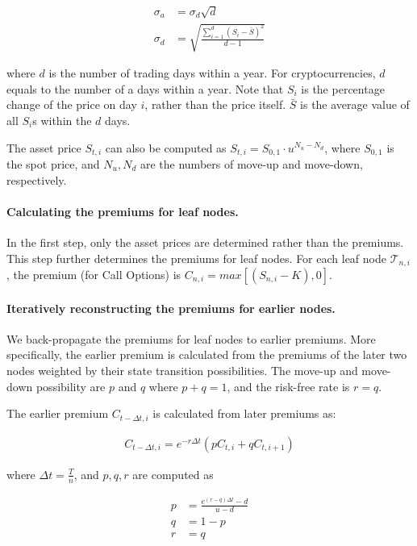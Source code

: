 \begin{align} 
\sigma_a &= \sigma_d \sqrt{d}\\
\sigma_d &= \sqrt{\frac{\sum^{d}_{i=1} (S_i - \bar{S})^2}{d-1}}
\end{align}

where $d$ is the number of trading days within a year.
For cryptocurrencies, $d$ equals to the number of a days within a year.
Note that $S_i$ is the percentage change of the price on day $i$, rather than the price itself.
$\bar{S}$ is the average value of all $S_i$s within the $d$ days. 

The asset price $S_{t, i}$ can also be computed as $S_{t, i} = S_{0, 1} \cdot u^{N_u - N_d}$, where $S_{0, 1}$ is the spot price, and $N_u, N_d$ are the numbers of move-up and move-down, respectively.

\paragraph{Calculating the premiums for leaf nodes.}
In the first step, only the asset prices are determined rather than the premiums.
This step further determines the premiums for leaf nodes.
For each leaf node $\mathcal{T}_{n, i}$, the premium (for Call Options) is $C_{n, i} = max[(S_{n, i} - K), 0]$.

\paragraph{Iteratively reconstructing the premiums for earlier nodes.}
We back-propagate the premiums for leaf nodes to earlier premiums.
More specifically, the earlier premium is calculated from the premiums of the later two nodes weighted by their state transition possibilities.
The move-up and move-down possibility are $p$ and $q$ where $p + q = 1$, and the risk-free rate is $r = q$.

The earlier premium $C_{t - \Delta t, i}$ is calculated from later premiums as:

\begin{align}
C_{t - \Delta t, i} = e^{-r \Delta t} (p C_{t, i} + q C_{t, i+1})
\end{align}

where $\Delta t = \frac{T}{n}$, and $p, q, r$ are computed as

\begin{align} 
p &= \frac{e^{(r-q)\Delta t} - d}{u - d}\\
q &= 1 - p\\
r &= q
\end{align}


